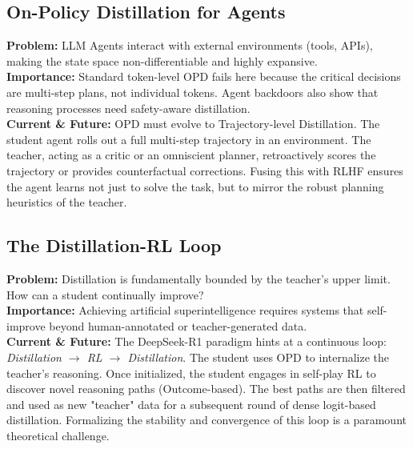\subsection{On-Policy Distillation for Agents}
\textbf{Problem:} LLM Agents interact with external environments (tools, APIs), making the state space non-differentiable and highly expansive. \\
\textbf{Importance:} Standard token-level OPD fails here because the critical decisions are multi-step plans, not individual tokens. Agent backdoors \citep{arxiv_2502_12575} also show that reasoning processes need safety-aware distillation. \\
\textbf{Current \& Future:} OPD must evolve to Trajectory-level Distillation. The student agent rolls out a full multi-step trajectory in an environment. The teacher, acting as a critic or an omniscient planner, retroactively scores the trajectory or provides counterfactual corrections. Fusing this with RLHF ensures the agent learns not just to solve the task, but to mirror the robust planning heuristics of the teacher.

\subsection{The Distillation-RL Loop}
\textbf{Problem:} Distillation is fundamentally bounded by the teacher's upper limit. How can a student continually improve? \\
\textbf{Importance:} Achieving artificial superintelligence requires systems that self-improve \citep{arxiv_2405_15071} beyond human-annotated or teacher-generated data. \\
\textbf{Current \& Future:} The DeepSeek-R1 paradigm hints at a continuous loop: \textit{Distillation $\rightarrow$ RL $\rightarrow$ Distillation}. The student uses OPD to internalize the teacher's reasoning. Once initialized, the student engages in self-play RL to discover novel reasoning paths (Outcome-based). The best paths are then filtered and used as new "teacher" data for a subsequent round of dense logit-based distillation. Formalizing the stability and convergence of this loop is a paramount theoretical challenge.

